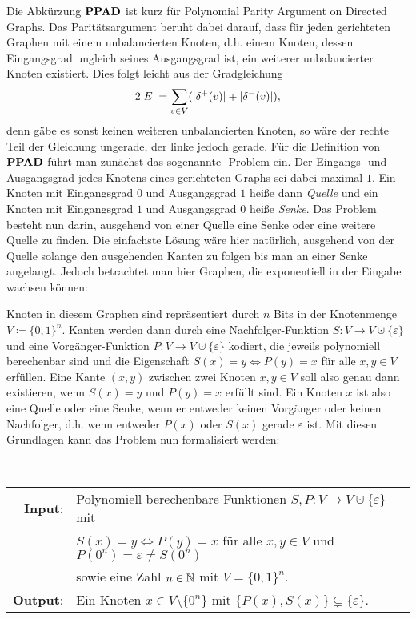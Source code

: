 Die Abkürzung $\textbf{PPAD}$ ist kurz für \glqq Polynomial Parity Argument on Directed Graphs\grqq.
Das Paritätsargument beruht dabei darauf, dass für jeden gerichteten Graphen mit einem unbalancierten Knoten, d.h. einem Knoten, dessen Eingangsgrad ungleich seines Ausgangsgrad ist, ein weiterer unbalancierter Knoten existiert.
Dies folgt leicht aus der Gradgleichung
\[
	2 \lvert E\rvert = \sum_{v\in V} ( \lvert\delta^+(v)\rvert + \lvert\delta^-(v)\rvert ),
\]
denn gäbe es sonst keinen weiteren unbalancierten Knoten, so wäre der rechte Teil der Gleichung ungerade, der linke jedoch gerade.
Für die Definition von~$\textbf{PPAD}$ führt man zunächst das sogenannte \EndOfTheLine-Problem ein.
Der Eingangs- und Ausgangsgrad jedes Knotens eines gerichteten Graphs sei dabei maximal $1$.
Ein Knoten mit Eingangsgrad $0$ und Ausgangsgrad $1$ heiße dann \emph{Quelle} und ein Knoten mit Eingangsgrad $1$ und Ausgangsgrad $0$ heiße \emph{Senke}.
Das Problem besteht nun darin, ausgehend von einer Quelle eine Senke oder eine weitere Quelle zu finden.
Die einfachste Lösung wäre hier natürlich, ausgehend von der Quelle solange den ausgehenden Kanten zu folgen bis man an einer Senke angelangt.
Jedoch betrachtet man hier Graphen, die exponentiell in der Eingabe wachsen können:

Knoten in diesem Graphen sind repräsentiert durch $n$ Bits in der Knotenmenge $V\coloneq \{ 0,1 \}^n$.
Kanten werden dann durch eine Nachfolger-Funktion $S: V\rightarrow V\cupdot \{ \varepsilon \}$ und eine Vorgänger-Funktion $P: V\rightarrow V \cupdot \{ \varepsilon \}$ kodiert, die jeweils polynomiell berechenbar sind und die Eigenschaft $S(x) = y \Leftrightarrow P(y) = x$ für alle $x,y \in V$ erfüllen.
Eine Kante $(x,y)$ zwischen zwei Knoten $x,y \in V$ soll also genau dann existieren, wenn $S(x) = y$ und $P(y) = x$ erfüllt sind.
Ein Knoten $x$ ist also eine Quelle oder eine Senke, wenn er entweder keinen Vorgänger oder keinen Nachfolger, d.h. wenn entweder $P(x)$ oder $S(x)$ gerade $\varepsilon$ ist.
Mit diesen Grundlagen kann das Problem nun formalisiert werden:
\begin{center}
	\begin{mdframed}
		\centering
		\emph{\EndOfTheLine} \\[1em]
		\begin{tabular}{rl}
			{\bfseries Input}: &Polynomiell berechenbare Funktionen $S,P: V\rightarrow V\cupdot \{ \varepsilon \}$ mit\\
			& $S(x) = y \Leftrightarrow P(y) = x$ für alle $x,y \in V$ und
			$P(0^n) = \varepsilon \neq S(0^n)$\\
			& sowie eine Zahl $n\in\mathbb{N}$ mit $V = \{ 0, 1 \}^n$.\\
			{\bfseries Output}: & Ein Knoten $x\in V\setminus \{ 0^n \}$ mit $\{ P(x), S(x) \} \subsetneq \{ \varepsilon \}$.
		\end{tabular}
	\end{mdframed}
\end{center}

